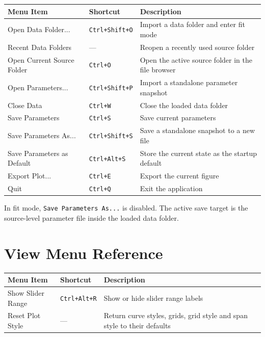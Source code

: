 \documentclass[12pt,a4paper]{article}
\newcommand{\menu}[1]{\texttt{#1}}
\newcommand{\key}[1]{\texttt{#1}}
\begin{document}
\begin{center}
\begin{tabular}{@{}lll@{}}
  \toprule
  Menu Item & Shortcut & Description \\
  \midrule
  Open Data Folder...        & \key{Ctrl+Shift+O} & Import a data folder and enter fit mode \\
  Recent Data Folders        & ---                & Reopen a recently used source folder \\
  Open Current Source Folder & \key{Ctrl+O}       & Open the active source folder in the file browser \\
  Open Parameters...         & \key{Ctrl+Shift+P} & Import a standalone parameter snapshot \\
  Close Data                 & \key{Ctrl+W}       & Close the loaded data folder \\
  Save Parameters            & \key{Ctrl+S}       & Save current parameters \\
  Save Parameters As...      & \key{Ctrl+Shift+S} & Save a standalone snapshot to a new file \\
  Save Parameters as Default & \key{Ctrl+Alt+S}   & Store the current state as the startup default \\
  Export Plot...             & \key{Ctrl+E}       & Export the current figure \\
  Quit                       & \key{Ctrl+Q}       & Exit the application \\
  \bottomrule
\end{tabular}
\end{center}

\begin{notebox}
In fit mode, \menu{Save Parameters As...} is disabled. The active save target is the source-level parameter file
inside the loaded data folder.
\end{notebox}

\section{View Menu Reference}

\begin{center}
\begin{tabular}{@{}lll@{}}
  \toprule
  Menu Item & Shortcut & Description \\
  \midrule
  Show Slider Range & \key{Ctrl+Alt+R} & Show or hide slider range labels \\
  Reset Plot Style  & ---              & Return curve styles, grids, grid style and span style to their defaults \\
  \bottomrule
\end{tabular}
\end{center}
\end{document}

